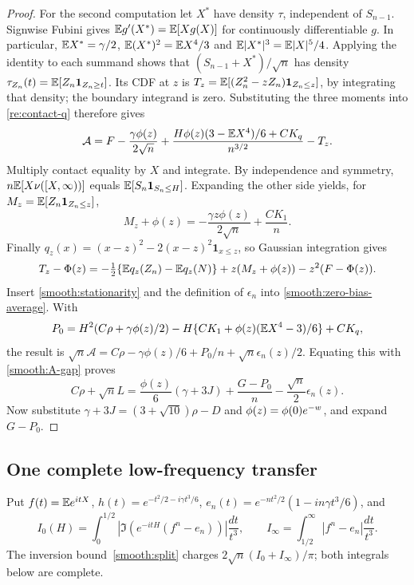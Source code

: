\begin{proof}
For the second computation let $X^*$ have density $\tau$, independent of
$S_{n-1}$. Signwise Fubini gives
$\mathbb E g'(X^*)=\mathbb E[Xg(X)]$ for continuously differentiable $g$.
In particular,
$\mathbb E X^*=\gamma/2$, $\mathbb E(X^*)^2=\mathbb E X^4/3$ and
$\mathbb E|X^*|^3=\mathbb E|X|^5/4$.
Applying the identity to each summand shows that
$(S_{n-1}+X^*)/\sqrt n$ has density
$\tau_{Z_n}(t)=\mathbb E[Z_n\mathbf1_{Z_n\ge t}]$.
Its CDF at $z$ is
$T_z=\mathbb E[(Z_n^2-zZ_n)\mathbf1_{Z_n\le z}]$, by integrating that density;
the boundary integrand is zero. Substituting the three moments into
\eqref{re:contact-q} therefore gives
\begin{equation}\label{smooth:zero-bias-average}
 \mathcal A=F-\frac{\gamma\phi(z)}{2\sqrt n}
 +\frac{H\phi(z)(3-\mathbb E X^4)/6+CK_q}{n^{3/2}}-T_z.
\end{equation}
Multiply contact equality by $X$ and integrate. By independence and symmetry,
$n\mathbb E[X\nu([X,\infty))]$ equals $\mathbb E[S_n\mathbf1_{S_n\le H}]$.
Expanding the other side yields, for $M_z=\mathbb E[Z_n\mathbf1_{Z_n\le z}]$,
\begin{equation}\label{smooth:stationarity}
 M_z+\phi(z)=-\frac{\gamma z\phi(z)}{2\sqrt n}+\frac{CK_1}{n}.
\end{equation}
Finally $q_z(x)=(x-z)^2-2(x-z)^2\mathbf1_{x\le z}$, so Gaussian
integration gives
\begin{equation}\label{smooth:truncated-square}
 T_z-\Phi(z)=-\tfrac12\{\mathbb E q_z(Z_n)-\mathbb E q_z(N)\}
 +z(M_z+\phi(z))-z^2(F-\Phi(z)).
\end{equation}
Insert \eqref{smooth:stationarity} and the definition of $\epsilon_n$
into \eqref{smooth:zero-bias-average}. With
\[
 P_0=H^2(C\rho+\gamma\phi(z)/2)
       -H\{CK_1+\phi(z)(\mathbb E X^4-3)/6\}+CK_q,
\]
the result is $\sqrt n\mathcal A=C\rho-\gamma\phi(z)/6+
P_0/n+\sqrt n\epsilon_n(z)/2$. Equating this with
\eqref{smooth:A-gap} proves
\begin{equation}\label{smooth:signed-identity}
 C\rho+\sqrt nL=\frac{\phi(z)}6(\gamma+3J)
                 +\frac{G-P_0}{n}-\frac{\sqrt n}2\epsilon_n(z).
\end{equation}
Now substitute $\gamma+3J=(3+\sqrt{10})\rho-D$ and
$\phi(z)=\phi(0) e^{-w}$, and expand $G-P_0$.
\end{proof}

\subsection{One complete low-frequency transfer}
Put $f(t)=\mathbb E e^{itX}$, $h(t)=e^{-t^2/2-i\gamma t^3/6}$,
$e_n(t)=e^{-nt^2/2}(1-in\gamma t^3/6)$, and
\[
 I_0(H)=\int_0^{1/2}|\Im(e^{-itH}(f^n-e_n))|\frac{dt}{t^3},\qquad
 I_\infty=\int_{1/2}^\infty|f^n-e_n|\frac{dt}{t^3}.
\]
The inversion bound~\eqref{smooth:split} charges
$2\sqrt n(I_0+I_\infty)/\pi$; both integrals below are complete.

